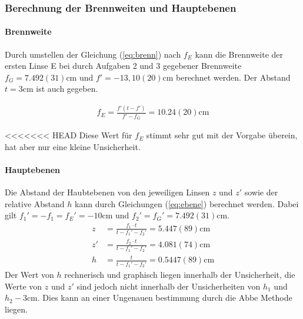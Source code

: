 \documentclass[11pt, a4paper]{article}
\begin{document}
    \subsubsection{Berechnung der Brennweiten und Hauptebenen}
    \paragraph{Brennweite}
    Durch umstellen der Gleichung (\ref{eq:brenn}) nach $f_E$ kann die Brennweite der ersten Linse E bei durch Aufgaben 2 und 3 gegebener Brennweite $f_G = 7.492(31) \si{\centi\metre}$ und $f' = - 13,10(20) \si{\centi\metre}$ berechnet werden. Der Abstand $t = 3 \si{\centi\metre}$ ist auch gegeben.

    \begin{align}
        f_E = \frac{f' \left(t - f'\right)}{f' - f_G} = 10.24(20) \si{\centi\metre}
    \end{align}

<<<<<<< HEAD
    Diese Wert für $f_E$ stimmt sehr gut mit der Vorgabe überein, hat aber nur eine kleine Unsicherheit.

    \paragraph{Hauptebenen}
    Die Abstand der Haubtebenen von den jeweiligen Linsen $z$ und $z'$ sowie der relative Abstand $h$ kann durch Gleichungen (\ref{eq:ebene}) berechnet werden. Dabei gilt $f_1' = -f_1 = f_E' = -10 \si{\centi\metre}$ und $f_2' = f_G' = 7.492(31) \si{\centi\metre}$.
    \begin{align}
        z &= \frac{f_1 \cdot t}{t - f_1' - f_2'} = 5.447(89) \si{\centi\metre} \\
        z' &= \frac{f_2 \cdot t}{t - f_1' - f_2'} = 4.081(74) \si{\centi\metre} \\
        h &= \frac{t}{t - f_1' - f_2'} = 0.5447(89) \si{\centi\metre}
    \end{align}
    Der Wert von $h$ rechnerisch und graphisch liegen innerhalb der Unsicherheit, die Werte von $z$ und $z'$ sind jedoch nicht innerhalb der Unsicherheiten von $h_1$ und $h_2 - 3 \si{\centi\metre}$. Dies kann an einer Ungenauen bestimmung durch die Abbe Methode liegen.
\end{document}
